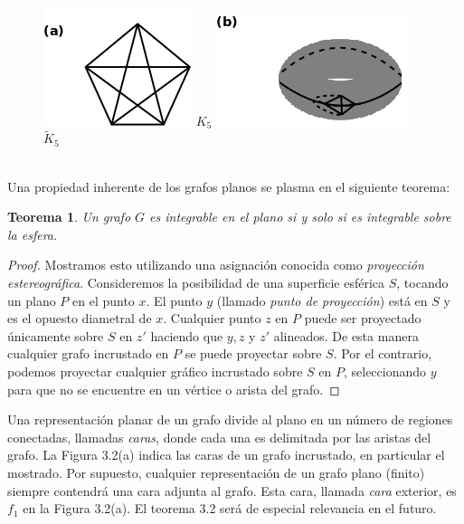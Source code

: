 \documentclass[10pt,a5paper]{book}
\newtheorem{teorema}{Teorema}[chapter]
\begin{document}
\begin{figure}[H]
\caption{ }
\hrulefill{}\\
\hspace*{.3in}\includegraphics[scale=.4]{Fig3_1_a.png} $K_5$ 
\includegraphics[scale=.4]{Fig3_1_b.png} $\widetilde{K}_5$
\end{figure}
\hrulefill{}\\



Una propiedad inherente de los grafos planos se plasma en el siguiente teorema:
\begin{teorema}
Un grafo $G$ es integrable en el plano si y solo si es integrable sobre la esfera.
\end{teorema}
\begin{proof}
Mostramos esto utilizando una asignación conocida como \emph{proyección estereográfica}. Consideremos la posibilidad de una superficie esférica $S$, tocando un plano $P$ en el punto $x$. El punto $y$ (llamado \emph{punto de proyección}) está en $S$ y es el opuesto diametral de $x$. Cualquier punto $z$ en $P$ puede ser proyectado únicamente sobre $S$ en $z'$ haciendo que $y, z$ y $z'$ alineados. De esta manera cualquier grafo incrustado en $P$ se puede proyectar sobre $S$. Por el contrario, podemos proyectar cualquier gráfico incrustado sobre $S$ en $P$, seleccionando $y$ para que no se encuentre en un vértice o arista del grafo.
\end{proof}

Una representación planar de un grafo divide al plano en un número de regiones conectadas, llamadas \emph{caras}, donde cada una es delimitada por las aristas del grafo. La Figura 3.2(a) indica las caras de un grafo incrustado, en particular el mostrado. Por supuesto, cualquier representación de un grafo plano (finito) siempre contendrá una cara adjunta al grafo. Esta cara, llamada \emph{cara} exterior, es $f_1$ en la Figura 3.2(a). El teorema 3.2 será de especial relevancia en el futuro.
\end{document}

